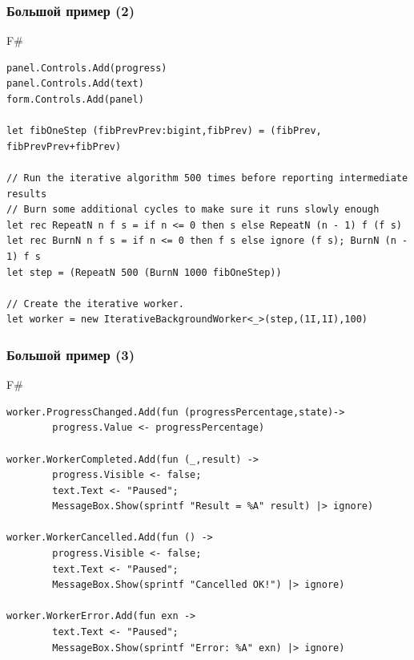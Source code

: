 \documentclass[xetex,mathserif,serif]{beamer}
\begin{document}
    \begin{frame}[fragile]
        \frametitle{Большой пример (2)}
        \begin{exampleblock}{F\#}
            \begin{lstlisting}[basicstyle=\scriptsize]
panel.Controls.Add(progress)
panel.Controls.Add(text)
form.Controls.Add(panel)

let fibOneStep (fibPrevPrev:bigint,fibPrev) = (fibPrev, fibPrevPrev+fibPrev)

// Run the iterative algorithm 500 times before reporting intermediate results
// Burn some additional cycles to make sure it runs slowly enough
let rec RepeatN n f s = if n <= 0 then s else RepeatN (n - 1) f (f s)
let rec BurnN n f s = if n <= 0 then f s else ignore (f s); BurnN (n - 1) f s
let step = (RepeatN 500 (BurnN 1000 fibOneStep))

// Create the iterative worker.
let worker = new IterativeBackgroundWorker<_>(step,(1I,1I),100)
\end{lstlisting}
\end{exampleblock}
\end{frame}

    \begin{frame}[fragile]
        \frametitle{Большой пример (3)}
        \begin{exampleblock}{F\#}
            \begin{lstlisting}[basicstyle=\scriptsize]
worker.ProgressChanged.Add(fun (progressPercentage,state)->
        progress.Value <- progressPercentage)

worker.WorkerCompleted.Add(fun (_,result) ->
        progress.Visible <- false;
        text.Text <- "Paused";
        MessageBox.Show(sprintf "Result = %A" result) |> ignore)

worker.WorkerCancelled.Add(fun () ->
        progress.Visible <- false;
        text.Text <- "Paused";
        MessageBox.Show(sprintf "Cancelled OK!") |> ignore)

worker.WorkerError.Add(fun exn ->
        text.Text <- "Paused";
        MessageBox.Show(sprintf "Error: %A" exn) |> ignore)
\end{lstlisting}
\end{exampleblock}
\end{frame}
\end{document}
